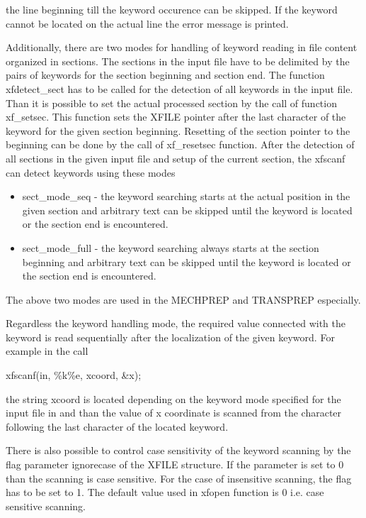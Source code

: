 \begin{itemize}
\begin{itemize}
                             the line beginning till the keyword occurence can be skipped. If the keyword cannot be located
                             on the actual line the error message is printed.
      \end{itemize}
      Additionally, there are two modes for handling of keyword reading in file content organized in sections. The
      sections in the input file have to be delimited by the pairs of keywords for the section beginning and section end.
      The function {\sf xfdetect\_sect} has to be called for the detection of all keywords in the input file. Than it is 
      possible to set the actual processed section by the call of function {\sf xf\_setsec}. This function sets the 
      {\sf XFILE} pointer after the last character of the keyword for the given section beginning. Resetting of the 
      section pointer to the beginning can be done by the call of {\sf xf\_resetsec} function. After the detection 
      of all sections in the given input file and setup of the current section, the {\sf xfscanf} can detect keywords 
      using these modes
      \begin{itemize}
      \item {\sf sect\_mode\_seq} - the keyword searching starts at the actual position in the given section and arbitrary 
                                 text can be skipped until the keyword is located or the section end is encountered.
      \item {\sf sect\_mode\_full} - the keyword searching always starts at the section beginning and arbitrary 
                                 text can be skipped until the keyword is located or the section end is encountered.
      \end{itemize}
      The above two modes are used in the MECHPREP and TRANSPREP especially. 

      Regardless the keyword handling mode, the required value connected with the keyword is read sequentially after the 
      localization of the given keyword. For example in the call
      \begin{center}
        {\sf xfscanf(in, \textquotedbl\%k\%e\textquotedbl, \textquotedbl xcoord\textquotedbl, \&x);}
      \end{center}
      the string {\sf \textquotedbl xcoord\textquotedbl} is located depending on the keyword mode specified for the 
      input file {\sf in} and than the value of {\sf x} coordinate is scanned from the character following the last 
      character of the located keyword. 

      There is also possible to control case sensitivity of the keyword scanning 
      by the flag parameter {\sf ignorecase} of the {\sf XFILE} structure. If the parameter is set to 0 than the 
      scanning is case sensitive. For the case of insensitive scanning, the flag has to be set to 1. The default value 
      used in {\sf xfopen} function is 0 i.e. case sensitive scanning.

\end {itemize}

